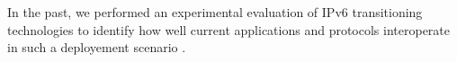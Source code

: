 In the past, we performed an experimental evaluation of IPv6 transitioning
technologies to identify how well current applications and protocols
interoperate in such a deployement scenario \cite{vbajpai:2012}.
